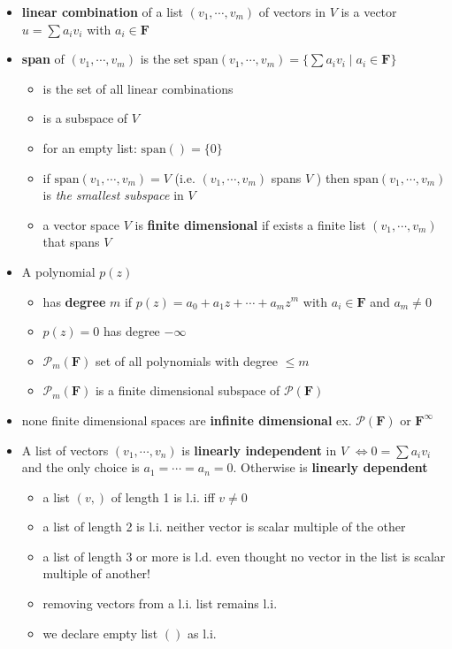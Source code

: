 \documentclass[11pt,notitlepage,oneside]{article}
\begin{document}
\begin{itemize}
\item \textbf{linear combination} of a list $(v_1, \cdots, v_m)$ of vectors in $V$ is a vector $u = \sum a_i v_i$ with $a_i\in \mathbf{F}$
\item \textbf{span} of $(v_1, \cdots, v_m)$ is the set $\mathrm{span}(v_1, \cdots, v_m) = \{ \sum a_i v_i \mid a_i\in\mathbf{F}\}$
\begin{itemize}
  \item is the set of all linear combinations
  \item is a subspace of $V$
  \item for an empty list: $\mathrm{span}() = \{0\}$
  \item if $\mathrm{span}(v_1, \cdots, v_m) = V$ (i.e. $(v_1, \cdots, v_m)$ spans $V$ ) then $\mathrm{span}(v_1, \cdots, v_m)$ is \emph{the smallest subspace} in $V$
  \item a vector space $V$ is \textbf{finite dimensional} if exists a finite list $(v_1, \cdots, v_m)$ that spans $V$
\end{itemize}
\item A polynomial $p(z)$ 
\begin{itemize}
  \item has \textbf{degree} $m$ if $p(z)=a_0+a_1z+\cdots+a_mz^m$ with $a_i\in \mathbf{F}$ and $a_m\neq 0$
  \item $p(z)=0$ has degree $-\infty$
  \item $\mathcal{P}_m(\mathbf{F})$ set of all polynomials with degree $\leq m$
  \item $\mathcal{P}_m(\mathbf{F})$ is a finite dimensional subspace of $\mathcal{P}(\mathbf{F})$
\end{itemize}
\item none finite dimensional spaces are \textbf{infinite dimensional} ex. $\mathcal{P}(\mathbf{F})$ or $\mathbf{F}^\infty$
\item A list of vectors $(v_1,\cdots,v_n)$ is \textbf{linearly independent} in $V$ $\iff 0 = \sum a_i v_i$
and the only choice is $a_1=\cdots=a_n=0$. Otherwise is \textbf{linearly dependent}
\begin{itemize}
  \item a list $(v,)$ of length 1 is l.i. iff $v\neq 0$
  \item a list of length 2 is l.i. neither vector is scalar multiple of the other
  \item a list of length 3 or more is l.d. even thought no vector in the list is scalar multiple of another!
  \item removing vectors from a l.i. list remains l.i.
  \item we declare empty list $()$ as l.i.
\end{itemize}


\end{itemize}
\end{document}
